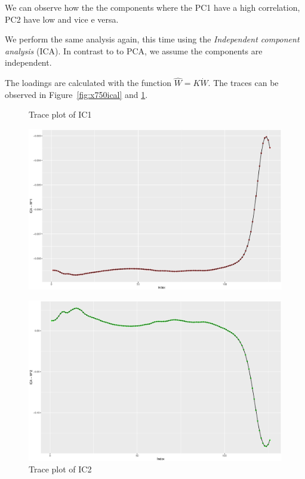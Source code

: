 \documentclass[a4paper,12pt]{article}
\begin{document}
    We can observe how the the components where the PC1 have a high correlation, PC2 have low and vice e versa. 

    We perform the same analysis again, this time using the \emph{Independent component analysis} (ICA). In contrast to to PCA, we assume the components are independent.

    The loadings are calculated with the function \( \hat{W} = K \dot W \). The traces can be observed in Figure~\ref{fig:x750ical} and \ref{fig:x752ical}.

    \begin{figure}[H]           
    \centering
    \begin{minipage}[]{0.49\textwidth}

    \caption{Trace plot of IC1}
    \label{fig:x750ical}
    \includegraphics[width=\textwidth]{figures/A2_trace_ICA1.eps}
    \end{minipage}
    \begin{minipage}[]{0.49\textwidth}
    \caption{Trace plot of IC2}
    \label{fig:x752ical}
    \includegraphics[width=\textwidth]{figures/A2_trace_ICA2.eps}
    \end{minipage}
    \end{figure}
\end{document}
